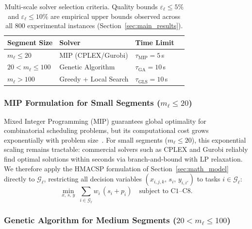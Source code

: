 \documentclass[manuscript,screen,review]{acmart}
\begin{document}
\begin{table}[t]
    \centering
    \caption{Multi-scale solver selection criteria. Quality bounds $\varepsilon_\ell \leq 5\%$ and $\varepsilon_\ell \leq 10\%$
	are empirical upper bounds observed across all 800 experimental instances (Section~\ref{sec:main_results}).}
    \label{tab:solver_selection}
    \small
    \begin{tabular}{@{}llll@{}}
        \toprule
        \textbf{Segment Size} & \textbf{Solver} & \textbf{Time Limit} \\
        \midrule
        $m_\ell \leq 20$        & MIP (CPLEX/Gurobi) & $\tau_{\mathrm{MIP}} = 5$\,s \\
        $20 < m_\ell \leq 100$  & Genetic Algorithm  & $\tau_{\mathrm{GA}} = 10$\,s \\
        $m_\ell > 100$          & Greedy + Local Search & $\tau_{\mathrm{GLS}} = 10$\,s \\
        \bottomrule
    \end{tabular}
\end{table}
\subsubsection{MIP Formulation for Small Segments ($m_\ell \leq 20$)}

Mixed Integer Programming (MIP) guarantees global optimality for combinatorial
scheduling problems, but its computational cost grows exponentially with problem
size~\cite{baker2018principles}. For small segments ($m_\ell \leq 20$), this
exponential scaling remains tractable: commercial solvers such as
CPLEX and Gurobi reliably find optimal
solutions within seconds via branch-and-bound with LP relaxation. We therefore
apply the HMACSP formulation of Section~\ref{sec:math_model} directly to
$\mathcal{G}_\ell$, restricting all decision variables
$(x_{i,j,k},\, s_i,\, y_{i,i'})$ to tasks $i \in \mathcal{G}_\ell$:
\begin{equation}
    \min_{x,\, s,\, y} \;\sum_{i \in \mathcal{G}_\ell} w_i\,(s_i + p_i)
    \quad \text{subject to C1--C8}.
    \label{eq:mip_segment}
\end{equation}

\subsubsection{Genetic Algorithm for Medium Segments ($20 < m_\ell \leq 100$)}
\end{document}
